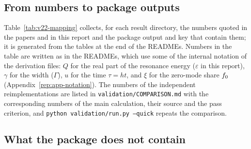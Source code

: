 

\subsection{From numbers to package outputs}\label{sec:v22-map}

Table~\ref{tab:v22-mapping} collects, for each result directory, the numbers quoted in the papers and in this report and the package output and key that contain them; it is generated from the tables at the end of the READMEs.
Numbers in the table are written as in the READMEs, which use some of the internal notation of the derivation files: $Q$ for the real part of the resonance energy ($\varepsilon$ in this report), $\gamma$ for the width ($\Gamma$), $u$ for the time $\tau=ht$, and $\xi$ for the zero-mode share $f_0$ (Appendix~\ref{rep:app-notation}).
The numbers of the independent reimplementations are listed in \texttt{validation/\allowbreak COMPARISON.md} with the corresponding numbers of the main calculation, their source and the pass criterion, and \texttt{python validation/\allowbreak run.py --quick} repeats the comparison.



\subsection{What the package does not contain}\label{sec:v22-limits}

